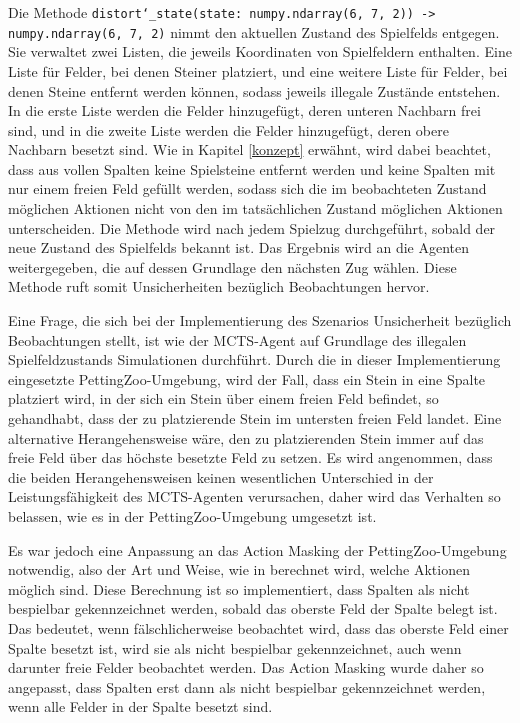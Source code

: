 	Die Methode \texttt{distort\char`_state(state: numpy.ndarray(6, 7, 2)) -> numpy.ndarray(6, 7, 2)} nimmt den aktuellen Zustand des Spielfelds entgegen. Sie verwaltet zwei Listen, die jeweils Koordinaten von Spielfeldern enthalten. Eine Liste für Felder, bei denen Steiner platziert, und eine weitere Liste für Felder, bei denen Steine entfernt werden können, sodass jeweils illegale Zustände entstehen. In die erste Liste werden die Felder hinzugefügt, deren unteren Nachbarn frei sind, und in die zweite Liste werden die Felder hinzugefügt, deren obere Nachbarn besetzt sind. Wie in Kapitel \ref{konzept} erwähnt, wird dabei beachtet, dass aus vollen Spalten keine Spielsteine entfernt werden und keine Spalten mit nur einem freien Feld gefüllt werden, sodass sich die im beobachteten Zustand möglichen Aktionen nicht von den im tatsächlichen Zustand möglichen Aktionen unterscheiden. Die Methode wird nach jedem Spielzug durchgeführt, sobald der neue Zustand des Spielfelds bekannt ist. Das Ergebnis wird an die Agenten weitergegeben, die auf dessen Grundlage den nächsten Zug wählen. Diese Methode ruft somit Unsicherheiten bezüglich Beobachtungen hervor. 

\endgroup

Eine Frage, die sich bei der Implementierung des Szenarios Unsicherheit bezüglich Beobachtungen stellt, ist wie der MCTS-Agent auf Grundlage des illegalen Spielfeldzustands Simulationen durchführt. Durch die in dieser Implementierung eingesetzte PettingZoo-Umgebung, wird der Fall, dass ein Stein in eine Spalte platziert wird, in der sich ein Stein über einem freien Feld befindet, so gehandhabt, dass der zu platzierende Stein im untersten freien Feld landet. Eine alternative Herangehensweise wäre, den zu platzierenden Stein immer auf das freie Feld über das höchste besetzte Feld zu setzen. Es wird angenommen, dass die beiden Herangehensweisen keinen wesentlichen Unterschied in der Leistungsfähigkeit des MCTS-Agenten verursachen, daher wird das Verhalten so belassen, wie es in der PettingZoo-Umgebung umgesetzt ist.

Es war jedoch eine Anpassung an das Action Masking der PettingZoo-Umgebung notwendig, also der Art und Weise, wie in berechnet wird, welche Aktionen möglich sind. Diese Berechnung ist so implementiert, dass Spalten als nicht bespielbar gekennzeichnet werden, sobald das oberste Feld der Spalte belegt ist. Das bedeutet, wenn fälschlicherweise beobachtet wird, dass das oberste Feld einer Spalte besetzt ist, wird sie als nicht bespielbar gekennzeichnet, auch wenn darunter freie Felder beobachtet werden. Das Action Masking wurde daher so angepasst, dass Spalten erst dann als nicht bespielbar gekennzeichnet werden, wenn alle Felder in der Spalte besetzt sind.
